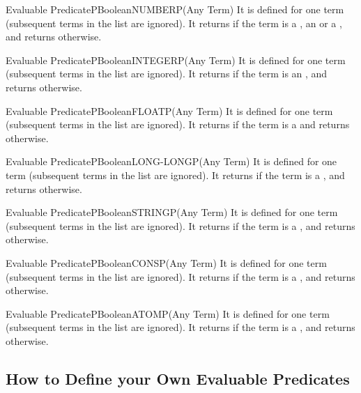 \begin{typeep}{Evaluable Predicate}{PBoolean}{NUMBERP}{(Any Term)}
It is defined for one term (subsequent terms in the list are ignored). It
returns  if the term is a , an  or a , and 
returns  otherwise.
\end{typeep}

\begin{typeep}{Evaluable Predicate}{PBoolean}{INTEGERP}{(Any Term)}
It is defined for one term (subsequent terms in the list are ignored). It
returns  if the term is an , and 
returns  otherwise.
\end{typeep}

\begin{typeep}{Evaluable Predicate}{PBoolean}{FLOATP}{(Any Term)}
It is defined for one term (subsequent terms in the list are ignored). It
returns  if the term is a   and 
returns  otherwise.
\end{typeep}

\begin{typeep}{Evaluable Predicate}{PBoolean}{LONG-LONGP}{(Any Term)}
It is defined for one term (subsequent terms in the list are ignored). It
returns  if the term is a , and 
returns  otherwise.
\end{typeep}

\begin{typeep}{Evaluable Predicate}{PBoolean}{STRINGP}{(Any Term)}
It is defined for one term (subsequent terms in the list are ignored). It
returns  if the term is a , and 
returns  otherwise.
\end{typeep}

\begin{typeep}{Evaluable Predicate}{PBoolean}{CONSP}{(Any Term)}
It is defined for one term (subsequent terms in the list are ignored). It
returns  if the term is a , and 
returns  otherwise.
\end{typeep}

\begin{typeep}{Evaluable Predicate}{PBoolean}{ATOMP}{(Any Term)}
It is defined for one term (subsequent terms in the list are ignored). It
returns  if the term is a , and 
returns  otherwise.
\end{typeep}

\subsection{How to Define your Own Evaluable Predicates}

